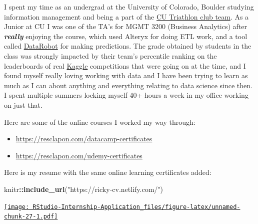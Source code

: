 \documentclass[
]{book}
\newenvironment{Shaded}{\begin{snugshade}}{\end{snugshade}}
\newcommand{\KeywordTok}[1]{\textcolor[rgb]{0.13,0.29,0.53}{\textbf{#1}}}
\newcommand{\NormalTok}[1]{#1}
\newcommand{\OperatorTok}[1]{\textcolor[rgb]{0.81,0.36,0.00}{\textbf{#1}}}
\newcommand{\StringTok}[1]{\textcolor[rgb]{0.31,0.60,0.02}{#1}}
\begin{document}
I spent my time as an undergrad at the University of Colorado, Boulder studying information management and being a part of the \href{https://www.cutriathlon.com/}{CU Triathlon club team}. As a Junior at CU I was one of the TA's for MGMT 3200 (Business Analytics) after \textbf{\emph{really}} enjoying the course, which used Alteryx for doing ETL work, and a tool called \href{https://www.datarobot.com/}{DataRobot} for making predictions. The grade obtained by students in the class was strongly impacted by their team's percentile ranking on the leaderboards of real \href{https://www.kaggle.com/}{Kaggle} competitions that were going on at the time, and I found myself really loving working with data and I have been trying to learn as much as I can about anything and everything relating to data science since then. I spent multiple summers locking myself 40+ hours a week in my office working on just that.

Here are some of the online courses I worked my way through:

\begin{itemize}
\item
  \url{https://resclapon.com/datacamp-certificates}
\item
  \url{https://resclapon.com/udemy-certificates}
\end{itemize}

Here is my resume with the same online learning certificates added:

\begin{Shaded}
\begin{Highlighting}[]
\NormalTok{knitr}\OperatorTok{::}\KeywordTok{include_url}\NormalTok{(}\StringTok{"https://ricky-cv.netlify.com/"}\NormalTok{)}
\end{Highlighting}
\end{Shaded}

\href{https://ricky-cv.netlify.com/}{\texttt{[image: RStudio-Internship-Application\_files/figure-latex/unnamed-chunk-27-1.pdf]}}
\end{document}
